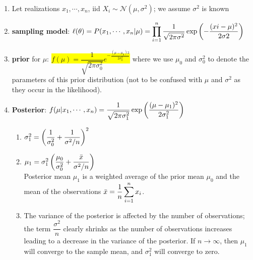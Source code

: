 \begin{enumerate}
    \item Let realizations $x_1, \cdots , x_n$, iid  $X_i \sim \mathcal{N} (\mu, \sigma^2)$; we assume $\sigma^2$ is known
    \hfill \cite{statistics/book/Statistics-for-Data-Scientists/Maurits-Kaptein}

    \item \textbf{sampling model}: 
    $
        \ell(\theta) 
        = P(x_1, \cdots , x_ n |\mu)
        = \displaystyle\prod^n_{i=1} \dfrac{1 }{\sqrt{2\pi\sigma^2}} \exp\left(-\dfrac{(xi -\mu)^2 }{2\sigma2}\right) 
    $
    \hfill \cite{statistics/book/Statistics-for-Data-Scientists/Maurits-Kaptein}

    \item \textbf{prior} for $\mu$: 
    \colorbox{yellow}{$
        f (\mu) 
        = \dfrac{1 }{\sqrt{2\pi\sigma^2 _0}} e ^{-\tfrac{(\mu-\mu_0 )2} {2\sigma^2 _0} }
    $}
    where we use $\mu_0$ and $\sigma^2 _0$ to denote the parameters of this prior distribution (not to be confused with $\mu$ and $\sigma^2$ as they occur in the likelihood).
    \hfill \cite{statistics/book/Statistics-for-Data-Scientists/Maurits-Kaptein}

    \item \textbf{Posterior}: 
    $
        f (\mu|x_1, \cdots , x_n ) 
        = \dfrac{1 }{\sqrt{2\pi\sigma^2 _1}} \exp \left(\dfrac{(\mu-\mu_1 )^2 }{2\sigma^2_ 1} \right)
    $
    \hfill \cite{statistics/book/Statistics-for-Data-Scientists/Maurits-Kaptein}
    \begin{enumerate}
        \item $\sigma^2 _1 = \left(\dfrac{1 }{\sigma^2_ 0} + \dfrac{1 }{\sigma^2/n} \right)^2$
        \hfill \cite{statistics/book/Statistics-for-Data-Scientists/Maurits-Kaptein}

        \item $\mu_1 = \sigma^2 _1 \left(\dfrac{\mu_0 }{\sigma^2_ 0} + \dfrac{\bar{x}} {\sigma^2/n}\right)$
        \hfill \cite{statistics/book/Statistics-for-Data-Scientists/Maurits-Kaptein}
        \\[0.2cm]
        Posterior mean $\mu_1$ is a weighted average of the prior mean $\mu_0$ and the mean of the observations $\bar{x} = \dfrac{1}{n} \displaystyle\sum^n _{i=1} x_ i$.
        \hfill \cite{statistics/book/Statistics-for-Data-Scientists/Maurits-Kaptein}

        \item The variance of the posterior is affected by the number of observations; the term $\dfrac{\sigma^2}{n}$ clearly shrinks as the number of observations increases leading to a decrease in the variance of the posterior. 
        If $n \to \infty$, then $\mu_1$ will converge to the sample mean, and $\sigma^2 _1$ will converge to zero.
        \hfill \cite{statistics/book/Statistics-for-Data-Scientists/Maurits-Kaptein}
    \end{enumerate}
\end{enumerate}



